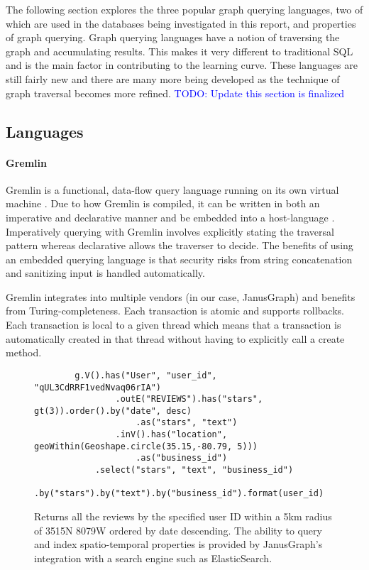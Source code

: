 The following section explores the three popular graph querying languages, two of which are used in the databases being investigated in this report, and properties of graph querying. Graph querying languages have a notion of traversing the graph and accumulating results. This makes it very different to traditional SQL and is the main factor in contributing to the learning curve. These languages are still fairly new and there are many more being developed as the technique of graph traversal becomes more refined. \textcolor{blue}{TODO: Update this section is finalized}

\subsection{Languages}
\label{subsec:lang}

\paragraph{Gremlin}

Gremlin is a functional, data-flow query language running on its own virtual machine \cite{gremlin-tinkerpop}. Due to how Gremlin is compiled, it can be written in both an imperative and declarative manner and be embedded into a host-language \cite{tinkerpop-docs}. Imperatively querying with Gremlin involves explicitly stating the traversal pattern whereas declarative allows the traverser to decide. The benefits of using an embedded querying language is that security risks from string concatenation and sanitizing input is handled automatically.

Gremlin integrates into multiple vendors (in our case, JanusGraph) and benefits from Turing-completeness. Each transaction is atomic and supports rollbacks. Each transaction is local to a given thread which means that a transaction is automatically created in that thread without having to explicitly call a create method.

\begin{figure}
    \centering
    \begin{verbatim}
        g.V().has("User", "user_id", "qUL3CdRRF1vedNvaq06rIA")
                .outE("REVIEWS").has("stars", gt(3)).order().by("date", desc)
                    .as("stars", "text")
                .inV().has("location", geoWithin(Geoshape.circle(35.15,-80.79, 5)))
                    .as("business_id")
            .select("stars", "text", "business_id")
            .by("stars").by("text").by("business_id").format(user_id)
    \end{verbatim}
    \caption{Returns all the reviews by the specified user ID within a 5km radius of 35\degree 15N 80\degree 79W ordered by date descending. The ability to query and index spatio-temporal properties is provided by JanusGraph's integration with a search engine such as ElasticSearch.}
    \label{lst:gremlin-example-1}
\end{figure}

